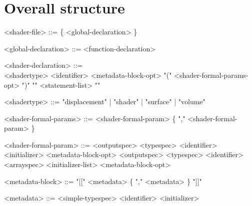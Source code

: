 \documentclass[11pt,letterpaper]{book}
\begin{document}
\section*{Overall structure}

\begin{grammar}
<shader-file> ::= \{ <global-declaration> \}

<global-declaration> ::= <function-declaration> 

<shader-declaration> ::= \spc \\ 
    <shadertype> <identifier> <metadata-block-opt> 
    "(" <shader-formal-params-opt> ")" "{" <statement-list> "}"

<shadertype> ::= "displacement" |  "shader" | "surface" | "volume"

<shader-formal-params> ::= <shader-formal-param> \{ "," <shader-formal-param> \}

<shader-formal-param> ::= <outputspec> <typespec> <identifier>
                               <initializer> <metadata-block-opt>
\alt <outputspec> <typespec> <identifier> <arrayspec>
          <initializer-list> <metadata-block-opt>

<metadata-block> ::= "[[" <metadata> \{ "," <metadata> \} "]]"

<metadata> ::= <simple-typespec> <identifier> <initializer>

\end{grammar}
\end{document}
